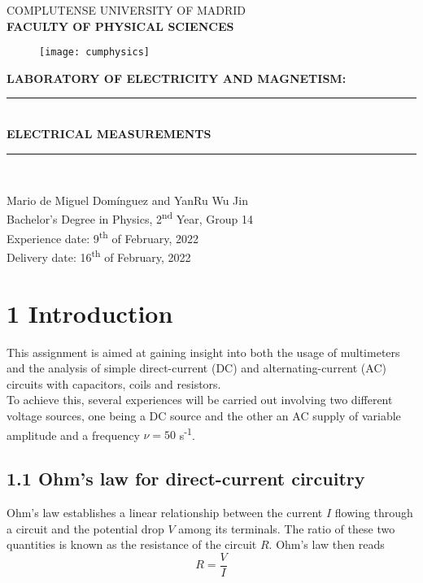 \documentclass[a4paper, 12pt]{article}
\newcommand\blankpage{%
	\null
	\thispagestyle{empty}%
	\addtocounter{page}{-1}%
	\newpage}
\begin{document}
	\begin{titlepage}
		\centering
		\vfill
		\Large{COMPLUTENSE UNIVERSITY OF MADRID \\ \textbf{FACULTY OF PHYSICAL SCIENCES}}
		\vfill
		\begin{figure}[h!]
			\centering
			\texttt{[image: cumphysics]}
		\end{figure}
		\vfill 
		\textbf{\Large{LABORATORY OF ELECTRICITY AND MAGNETISM:}}
		\rule [5pt]{14cm}{2pt}\\
		\Huge{\textbf{ELECTRICAL MEASUREMENTS}} \\
		\rule [8pt]{14cm}{2pt}\\
		\vfill
		\vfill
		\vfill
		\vfill
		
		\large{Mario de Miguel Domínguez and YanRu Wu Jin\\ Bachelor's Degree in Physics, 2\textsuperscript{nd} Year, Group 14\\ Experience date: 9\textsuperscript{th} of February, 2022\\ Delivery date: 16\textsuperscript{th} of February, 2022}
		\vfill
		\vfill
		\vfill
		\vfill
		
		\afterpage{\blankpage}
	\end{titlepage}
	
	\makeatletter
	\thispagestyle{empty}
	\addtocounter{page}{-1}
	\let\latexl@section\l@section
	\def\l@section#1#2{\begingroup\let\numberline\@gobble\latexl@section{#1}{#2}\endgroup}
	\let\latexl@subsection\l@subsection
	\def\l@subsection#1#2{\begingroup\let\numberline\@gobble\latexl@subsection{#1}{#2}\endgroup}
	\let\latexl@subsubsection\l@subsubsection
	\def\l@subsubsection#1#2{\begingroup\let\numberline\@gobble\latexl@subsubsection{#1}{#2}\endgroup}
	\makeatother
	\tableofcontents	
	\thispagestyle{empty}
	
	\afterpage{\blankpage}
	\newpage
\section{1 Introduction}
This assignment is aimed at gaining insight into both the usage of multimeters and the analysis of simple direct-current (DC) and alternating-current (AC) circuits with capacitors, coils and resistors. \\

To achieve this, several experiences will be carried out involving two different voltage sources, one being a DC source and the other an AC supply of variable amplitude and a frequency $\nu = 50$ s\textsuperscript{-1}. 
\subsection{1.1 Ohm's law for direct-current circuitry}
Ohm's law establishes a linear relationship between the current $I$ flowing through a circuit and the potential drop $V$ among its terminals. The ratio of these two quantities is known as the resistance of the circuit $R$. Ohm's law then reads
\begin{equation}\label{ohmslaw}
	R = \frac{V}{I}
\end{equation}
\end{document}
